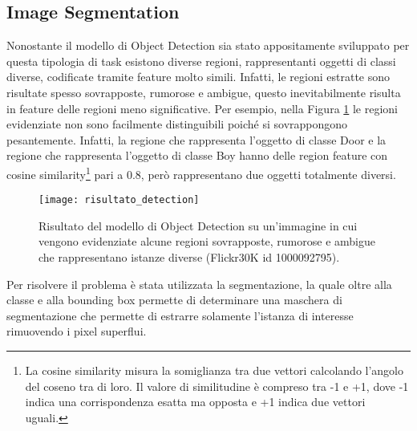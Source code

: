 \subsection{Image Segmentation}\label{image_segmentation}
Nonostante il modello di Object Detection sia stato appositamente sviluppato per questa tipologia di task esistono diverse regioni, rappresentanti oggetti di classi diverse, codificate tramite feature molto simili. 
Infatti, le regioni estratte sono risultate spesso sovrapposte, rumorose e ambigue, questo inevitabilmente risulta in feature delle regioni meno significative.
Per esempio, nella Figura \ref{figura:risultato_detection} le regioni evidenziate non sono facilmente distinguibili poiché si sovrappongono pesantemente. Infatti, la regione che rappresenta l'oggetto di classe Door e la regione che rappresenta l'oggetto di classe Boy hanno delle region feature con cosine similarity\footnote{La cosine similarity misura la somiglianza tra due vettori calcolando l'angolo del coseno tra di loro. Il valore di similitudine è compreso tra -1 e +1, dove -1 indica una corrispondenza esatta ma opposta e +1 indica due vettori uguali.} pari a 0.8, però rappresentano due oggetti totalmente diversi.
\begin{figure}[ht]
\centering
\texttt{[image: risultato\_detection]}
\caption{Risultato del modello di Object Detection su un'immagine in cui vengono evidenziate alcune regioni sovrapposte, rumorose e ambigue che rappresentano istanze diverse (Flickr30K id 1000092795).}\label{figura:risultato_detection}
\end{figure}
Per risolvere il problema è stata utilizzata la segmentazione, la quale oltre alla classe e alla bounding box permette di determinare una maschera di segmentazione che permette di estrarre solamente l'istanza di interesse rimuovendo i pixel superflui.


